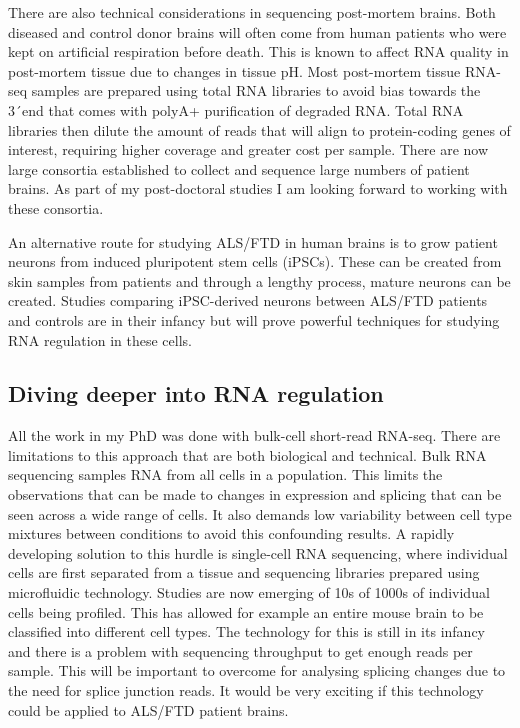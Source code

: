 There are also technical considerations in sequencing post-mortem brains.
Both diseased and control donor brains will often come from human patients who were kept on artificial respiration before death. 
This is known to affect RNA quality in post-mortem tissue due to changes in tissue pH.
Most post-mortem tissue RNA-seq samples are prepared using total RNA libraries to avoid bias towards the 3\'\ end that comes with polyA+ purification of degraded RNA.
Total RNA libraries then dilute the amount of reads that will align to protein-coding genes of interest, requiring higher coverage and greater cost per sample.
There are now large consortia established to collect and sequence large numbers of patient brains. 
As part of my post-doctoral studies I am looking forward to working with these consortia.

An alternative route for studying ALS/FTD in human brains is to grow patient neurons from induced pluripotent stem cells (iPSCs).
These can be created from skin samples from patients and through a lengthy process, mature neurons can be created.
Studies comparing iPSC-derived neurons between ALS/FTD patients and controls are in their infancy \citep{Luisier2018} but will prove powerful techniques for studying RNA regulation in these cells. %

\subsection{Diving deeper into RNA regulation}

All the work in my PhD was done with bulk-cell short-read RNA-seq. 
There are limitations to this approach that are both biological and technical.
Bulk RNA sequencing samples RNA from all cells in a population. 
This limits the observations that can be made to changes in expression and splicing that can be seen across a wide range of cells.
It also demands low variability between cell type mixtures between conditions to avoid this confounding results.
A rapidly developing solution to this hurdle is single-cell RNA sequencing, where individual cells are first separated from a tissue and sequencing libraries prepared using microfluidic technology.
Studies are now emerging of 10s of 1000s of individual cells being profiled. 
This has allowed for example an entire mouse brain to be classified into different cell types. %
The technology for this is still in its infancy and there is a problem with sequencing throughput to get enough reads per sample.
This will be important to overcome for analysing splicing changes due to the need for splice junction reads.
It would be very exciting if this technology could be applied to ALS/FTD patient brains. 

